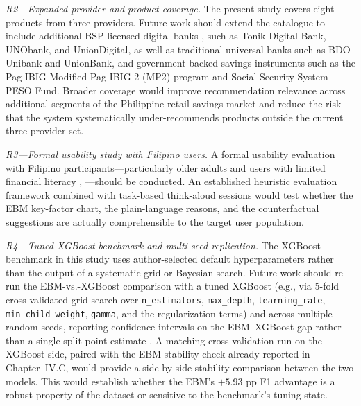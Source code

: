 \documentclass[journal]{./IEEE/IEEEtran}
\begin{document}
\textit{R2---Expanded provider and product coverage.} The present study covers eight products from three providers. Future work should extend the catalogue to include additional BSP-licensed digital banks \cite{ref36}, \cite{ref38} such as Tonik Digital Bank, UNObank, and UnionDigital, as well as traditional universal banks such as BDO Unibank and UnionBank, and government-backed savings instruments such as the Pag-IBIG Modified Pag-IBIG 2 (MP2) program and Social Security System PESO Fund. Broader coverage would improve recommendation relevance across additional segments of the Philippine retail savings market and reduce the risk that the system systematically under-recommends products outside the current three-provider set.

\textit{R3---Formal usability study with Filipino users.} A formal usability evaluation with Filipino participants---particularly older adults and users with limited financial literacy \cite{ref43}, \cite{ref76}---should be conducted. An established heuristic evaluation framework \cite{ref28} combined with task-based think-aloud sessions would test whether the EBM key-factor chart, the plain-language reasons, and the counterfactual suggestions are actually comprehensible to the target user population.

\textit{R4---Tuned-XGBoost benchmark and multi-seed replication.} The XGBoost benchmark in this study uses author-selected default hyperparameters rather than the output of a systematic grid or Bayesian search. Future work should re-run the EBM-vs.-XGBoost comparison with a tuned XGBoost (e.g., via 5-fold cross-validated grid search over \texttt{n\_estimators}, \texttt{max\_depth}, \texttt{learning\_rate}, \texttt{min\_child\_weight}, \texttt{gamma}, and the regularization terms) and across multiple random seeds, reporting confidence intervals on the EBM--XGBoost gap rather than a single-split point estimate \cite{ref68}. A matching cross-validation run on the XGBoost side, paired with the EBM stability check already reported in Chapter~IV.C, would provide a side-by-side stability comparison between the two models. This would establish whether the EBM's $+5.93$ pp F1 advantage is a robust property of the dataset or sensitive to the benchmark's tuning state.
\end{document}
